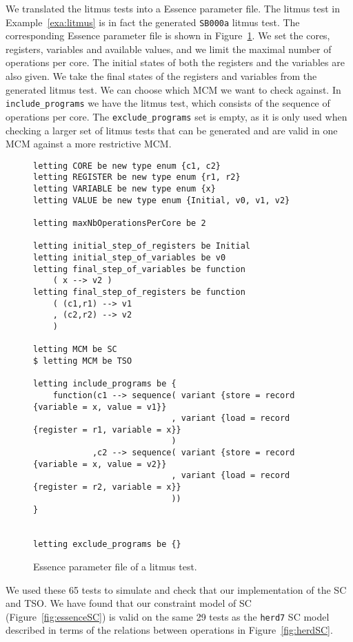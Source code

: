 \documentclass[runningheads]{llncs}
\begin{document}
We translated the litmus tests into a Essence parameter file.
The litmus test in Example~\ref{exa:litmus} is in fact the generated {\tt{SB000a}} litmus test.
The corresponding Essence parameter file is shown in Figure~\ref{fig:essenceparam}.
We set the cores, registers, variables and available values, and we limit the maximal number of operations per core.
The initial states of both the registers and the variables are also given.
We take the final states of the registers and variables from the generated litmus test.
We can choose which MCM we want to check against.
In {\tt{include\_programs}} we have the litmus test, which consists of the sequence of operations per core.
The {\tt{exclude\_programs}} set is empty, as it is only used when checking a larger set of litmus tests that can be generated and are valid in one MCM against a more restrictive MCM.

\begin{figure}
\begin{lstlisting}
letting CORE be new type enum {c1, c2}
letting REGISTER be new type enum {r1, r2}
letting VARIABLE be new type enum {x}
letting VALUE be new type enum {Initial, v0, v1, v2}

letting maxNbOperationsPerCore be 2

letting initial_step_of_registers be Initial
letting initial_step_of_variables be v0
letting final_step_of_variables be function
    ( x --> v2 )
letting final_step_of_registers be function
    ( (c1,r1) --> v1
    , (c2,r2) --> v2
    )

letting MCM be SC
$ letting MCM be TSO

letting include_programs be {
    function(c1 --> sequence( variant {store = record {variable = x, value = v1}}
                            , variant {load = record {register = r1, variable = x}}
                            )
            ,c2 --> sequence( variant {store = record {variable = x, value = v2}}
                            , variant {load = record {register = r2, variable = x}}
                            ))
}


letting exclude_programs be {}
\end{lstlisting}
\caption{Essence parameter file of a litmus test.\label{fig:essenceparam}}
\end{figure}


We used these 65 tests to simulate and check that our implementation of the SC and TSO.
We have found that our constraint model of SC (Figure~\ref{fig:essenceSC}) is valid on the same 29 tests as the {\tt{herd7}} SC model described in terms of the relations between operations in Figure~\ref{fig:herdSC}.
\end{document}

